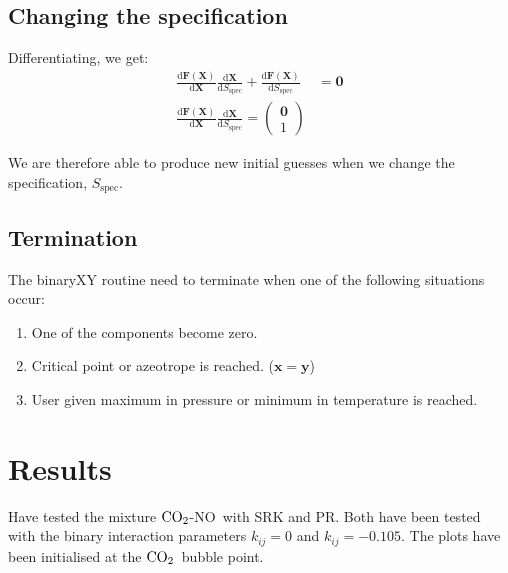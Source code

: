 \documentclass[english]{sintefmemo2012}
\newcommand*{\td}[2]{\frac{\mathrm{d} #1}{\mathrm{d} #2}}
\newcommand{\spec}{\text{spec}}
\newcommand{\coto}{\ensuremath{\text{CO}_{\text{\scriptsize 2}}}}
\newcommand{\no}{\ensuremath{\text{NO}}}
\begin{document}

\subsection{Changing the specification}
Differentiating, we get:
\begin{align}
\td{\mathbf{F(X)}}{\mathbf{X}}\td{\mathbf{X}}{S_{\spec}} 
+\td{\mathbf{F(X)}}{S_{\spec}} &= \mathbf{0}\\
\td{\mathbf{F(X)}}{\mathbf{X}}\td{\mathbf{X}}{S_{\spec}} 
 = \begin{pmatrix} \mathbf{0}\\
1
\end{pmatrix}
\end{align}

We are therefore able to produce new initial guesses when we change
the specification, $S_{\spec}$.

\subsection{Termination}
The binaryXY routine need to terminate when one of the following
situations occur:
\begin{enumerate}
\item One of the components become zero.
\item Critical point or azeotrope is
  reached. ($\mathbf{x}=\mathbf{y}$) \label{enum:crit}
\item User given maximum in pressure or minimum in temperature is reached. \label{enum:temp} 
\end{enumerate}

\section{Results}
Have tested the mixture \coto-\no~with SRK and PR. Both have been
tested with the binary interaction parameters $k_{ij}=0$ and
$k_{ij}=-0.105$. The plots have been initialised at the \coto~bubble point.
\end{document}
